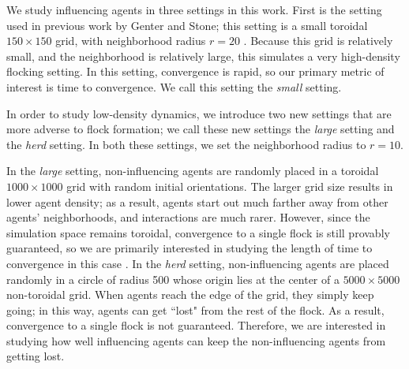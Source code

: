 We study influencing agents in three settings in this work.
First is the setting used in previous work by Genter and Stone; this setting
is a small toroidal $150\times150$ grid, with neighborhood radius $r=20$
\cite{genter2016facegoalfacecurrent, genter201612steplookahead, genterthesis}.
Because this grid is relatively small, and the neighborhood is relatively
large, this simulates a very high-density flocking setting.
In this setting, convergence is rapid, so our primary metric of interest is
time to convergence.
We call this setting the \textit{small} setting.

In order to study low-density dynamics, we introduce two new settings that are
more adverse to flock formation; we call these new settings the \textit{large}
setting and the \textit{herd} setting.
In both these settings, we set the neighborhood radius to $r=10$.

In the \textit{large} setting, non-influencing agents are randomly placed in a
toroidal $1000\times1000$ grid with random initial orientations.
The larger grid size results in lower agent density; as a result, agents start
out much farther away from other agents' neighborhoods, and interactions are
much rarer.
However, since the simulation space remains toroidal, convergence to a single
flock is still provably guaranteed, so we are primarily interested in
studying the length of time to convergence in this case
\cite{jad2003convergence}.
In the \textit{herd} setting, non-influencing agents are placed randomly in a
circle of radius 500 whose origin lies at the center of a $5000\times5000$
non-toroidal grid.
When agents reach the edge of the grid, they simply keep going; in this way,
agents can get ``lost" from the rest of the flock.
As a result, convergence to a single flock is not guaranteed.
Therefore, we are interested in studying how well influencing agents can keep
the non-influencing agents from getting lost.
